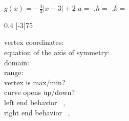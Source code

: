 \myWideProblemWithContent
{
    $g(x) =  -\frac{4}{3}|x - 3| + 2$
    \hfill 
    ${a} =$ ,\quad ${h} =$ ,\quad ${k} =$ 
    \tcblower 
    \begin{minipage}{0.29\textwidth}
        \centering
        \begin{myTikzpictureGrid}{0.4} [-3]{7}{5}
        \end{myTikzpictureGrid}
    \end{minipage}
    \begin{minipage}{0.7\textwidth}
        \vspace{0.5\baselineskip}
        vertex coordinates:~\dotfill{}\\[0.5\baselineskip]
        equation of the axis of symmetry:~\dotfill{}\\[0.5\baselineskip]
        domain:~\dotfill{}\\[0.5\baselineskip]
        range:~\dotfill{}\\[0.5\baselineskip]
        vertex is max/min?~\dotfill{}\\[0.5\baselineskip]
        curve opens up/down?~\dotfill{}\\[0.5\baselineskip]
        left end behavior~\dotfill{} , \\[0.5\baselineskip]
        right end behavior~\dotfill{} , 
    \end{minipage}
    \vspace{0.25\baselineskip}
}


